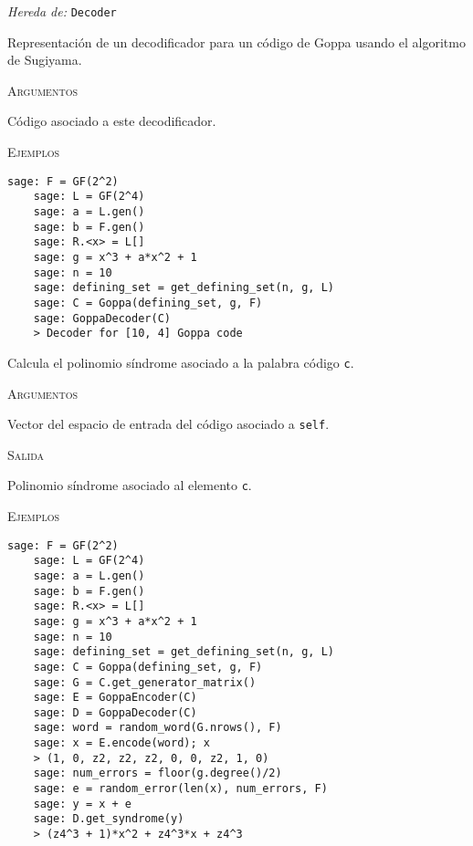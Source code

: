 \begin{description}[leftmargin=1em, font=\normalfont\ttfamily, style=nextline]
  \item[class GoppaDecoder(self, code)]

  \emph{Hereda de:} \texttt{Decoder}

Representación de un decodificador para un código de Goppa usando el algoritmo de Sugiyama.

\textsc{Argumentos}
\begin{description}[font=\normalfont\ttfamily]
  \item[code] Código asociado a este decodificador.
\end{description}

\textsc{Ejemplos}
  \begin{lstlisting}[gobble=4]
    sage: F = GF(2^2)
    sage: L = GF(2^4)
    sage: a = L.gen()
    sage: b = F.gen()
    sage: R.<x> = L[]
    sage: g = x^3 + a*x^2 + 1
    sage: n = 10
    sage: defining_set = get_defining_set(n, g, L)
    sage: C = Goppa(defining_set, g, F)
    sage: GoppaDecoder(C)
    > Decoder for [10, 4] Goppa code
  \end{lstlisting}

\begin{description}[font=\ttfamily, style=nextline]
  \item[get\_syndrome(self, c)] Calcula el polinomio síndrome asociado a la palabra código \texttt{c}.

  \textsc{Argumentos}
  \begin{description}[font=\normalfont\ttfamily]
      \item[c] Vector del espacio de entrada del código asociado a \texttt{self}.
  \end{description}

  \textsc{Salida}
  \begin{description}[font=\normalfont\ttfamily]
      \item[] Polinomio síndrome asociado al elemento \texttt{c}.
  \end{description}

  \textsc{Ejemplos}
  \begin{lstlisting}[gobble=4]
    sage: F = GF(2^2)
    sage: L = GF(2^4)
    sage: a = L.gen()
    sage: b = F.gen()
    sage: R.<x> = L[]
    sage: g = x^3 + a*x^2 + 1
    sage: n = 10
    sage: defining_set = get_defining_set(n, g, L)
    sage: C = Goppa(defining_set, g, F)
    sage: G = C.get_generator_matrix()
    sage: E = GoppaEncoder(C)
    sage: D = GoppaDecoder(C)
    sage: word = random_word(G.nrows(), F)
    sage: x = E.encode(word); x
    > (1, 0, z2, z2, z2, 0, 0, z2, 1, 0)
    sage: num_errors = floor(g.degree()/2)
    sage: e = random_error(len(x), num_errors, F)
    sage: y = x + e
    sage: D.get_syndrome(y)
    > (z4^3 + 1)*x^2 + z4^3*x + z4^3
  \end{lstlisting}


\end{description}
\end{description}
